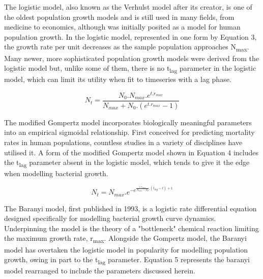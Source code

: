 \documentclass[11pt]{article}
\begin{document}
  



The logistic model, also known as the Verhulst model after its creator, is one of the oldest population growth models and is still used in many fields, from medicine to economics, although was initially posited as a model for human population growth.\parencite{Peleg1997} In the logistic model, represented in one form by Equation 3, the growth rate per unit decreases as the sample population approaches N\textsubscript{max}. Many newer, more sophisticated population growth models were derived from the logistic model but, unlike some of them, there is no t\textsubscript{lag} parameter in the logistic model, which can limit its utility when fit to timeseries with a lag phase.

\begin{equation}
    N_{t} = \frac{ N_{0} . N_{max} . e^{t . r_{max}}      }
                 { N_{max} + N_{0} . (e^{t . r_{max}} - 1)}
\end{equation}
\vspace{3mm}



The modified Gompertz model incorporates biologically meaningful parameters into an empirical sigmoidal relationship. \parencite{Tjørve2017, Buchanan1997} First conceived for predicting mortality rates in human populations, countless studies in a variety of disciplines have utilised it.\parencite{Tjørve2017, Buchanan1997,Mokhtari2019,Peleg1997} A form of the modified Gompertz model shown in Equation 4 includes the t\textsubscript{lag} parameter absent in the logistic model, which tends to give it the edge when modelling bacterial growth.\parencite{Tjørve2017,Buchanan1997}

\begin{equation}
    N_{t} = N_{max} . e^{-e^{\frac{ e . r_{max}   }
                                  { N_{max}-N_{0} } . (t_{lag} - t) + 1}}
\end{equation}
\vspace{3mm}



The Baranyi model, first published in 1993, is a logistic rate differential equation designed specifically for modelling bacterial growth curve dynamics.\parencite{Baranyi1993,Buchanan1997} Underpinning the model is the theory of a "bottleneck" chemical reaction limiting the maximum growth rate, r\textsubscript{max}.\parencite{Buchanan1997} Alongside the Gompertz model, the Baranyi model has overtaken the logistic model in popularity for modelling population growth, owing in part to the t\textsubscript{lag} parameter. Equation 5 represents the baranyi model rearranged to include the parameters discussed herein.
\end{document}
